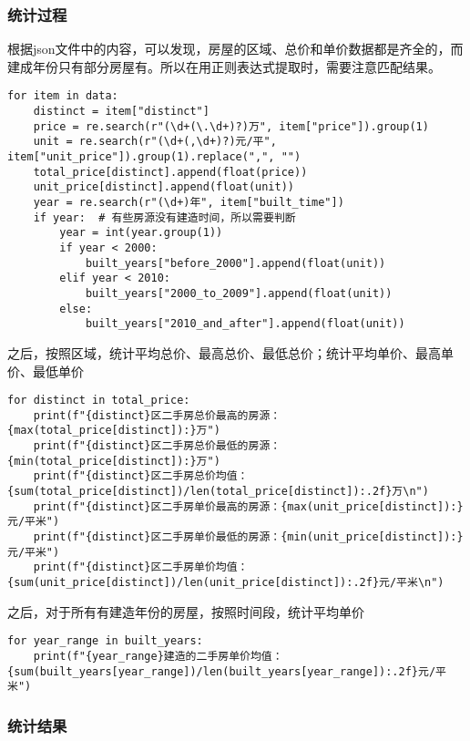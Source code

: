 \documentclass[lang=cn,11pt,a4paper]{elegantpaper}
\begin{document}
\subsubsection{统计过程}
根据json文件中的内容，可以发现，房屋的区域、总价和单价数据都是齐全的，而建成年份只有部分房屋有。所以在用正则表达式提取时，需要注意匹配结果。
\begin{lstlisting}
for item in data:
    distinct = item["distinct"]
    price = re.search(r"(\d+(\.\d+)?)万", item["price"]).group(1)
    unit = re.search(r"(\d+(,\d+)?)元/平", item["unit_price"]).group(1).replace(",", "")
    total_price[distinct].append(float(price))
    unit_price[distinct].append(float(unit))
    year = re.search(r"(\d+)年", item["built_time"])
    if year:  # 有些房源没有建造时间，所以需要判断
        year = int(year.group(1))
        if year < 2000:
            built_years["before_2000"].append(float(unit))
        elif year < 2010:
            built_years["2000_to_2009"].append(float(unit))
        else:
            built_years["2010_and_after"].append(float(unit))
\end{lstlisting}

之后，按照区域，统计平均总价、最高总价、最低总价；统计平均单价、最高单价、最低单价

\begin{lstlisting}
for distinct in total_price:
    print(f"{distinct}区二手房总价最高的房源：{max(total_price[distinct]):}万")
    print(f"{distinct}区二手房总价最低的房源：{min(total_price[distinct]):}万")
    print(f"{distinct}区二手房总价均值：{sum(total_price[distinct])/len(total_price[distinct]):.2f}万\n")
    print(f"{distinct}区二手房单价最高的房源：{max(unit_price[distinct]):}元/平米")
    print(f"{distinct}区二手房单价最低的房源：{min(unit_price[distinct]):}元/平米")
    print(f"{distinct}区二手房单价均值：{sum(unit_price[distinct])/len(unit_price[distinct]):.2f}元/平米\n")
\end{lstlisting}

之后，对于所有有建造年份的房屋，按照时间段，统计平均单价
\begin{lstlisting}
for year_range in built_years:
    print(f"{year_range}建造的二手房单价均值：{sum(built_years[year_range])/len(built_years[year_range]):.2f}元/平米")
\end{lstlisting}

\subsubsection{统计结果}
\end{document}
